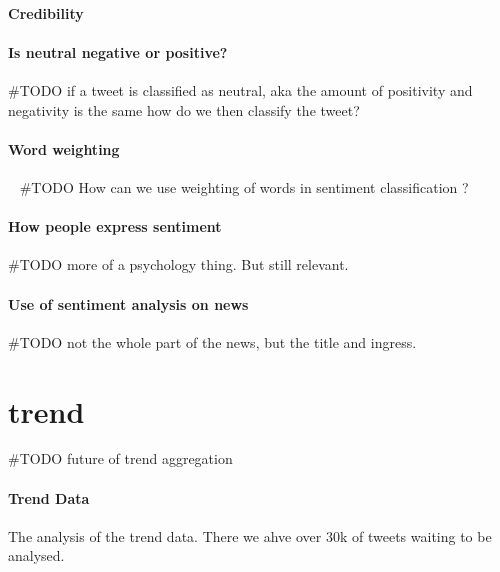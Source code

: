 \paragraph{Credibility}

\paragraph{Is neutral negative or positive?}
#TODO if a tweet is classified as neutral, aka the amount of positivity and
negativity is the same how do we then classify the tweet?

\paragraph{Word weighting} 
#TODO How can we use weighting of words in sentiment classification ?

\paragraph{How people express sentiment}
#TODO more of a psychology thing. But still relevant. 

\paragraph{Use of sentiment analysis on news}
#TODO not the whole part of the news, but the title and ingress. 
%

\section{trend}
#TODO future of trend aggregation

\paragraph{Trend Data}
The analysis of the trend data. There we ahve over 30k of tweets waiting to be
analysed.
%
